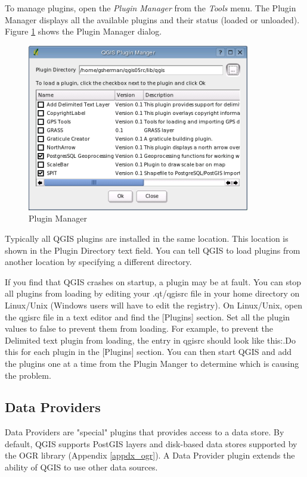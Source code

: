 \documentclass[10pt,english]{article}
\newcommand\qgistip[1]{\raggedright\small{#1}}
\begin{document}
\begin{onehalfspace}
To manage plugins, open the \textsl{Plugin Manager} from the \textsl{Tools} menu. The Plugin Manager displays all the available plugins and their status (loaded or unloaded). Figure \ref{fig:pluginmanager} shows the Plugin Manager dialog.

\begin{figure}[h]
   \begin{center}
   \caption{Plugin Manager}\label{fig:pluginmanager}\smallskip
   \includegraphics{qgis_user_guide_images/pluginmanager_80pct}
\end{center}  
\end{figure}
Typically all QGIS plugins are installed in the same location. This location is shown in the Plugin Directory text field. You can tell QGIS to load plugins from another location by specifying a different directory.
\begin{Tip}\caption{\textsc{Crashing Plugins}}
\qgistip{If you find that QGIS crashes on startup, a plugin may be at fault. You can stop all plugins from loading by editing your .qt/qgisrc file in your home directory on Linux/Unix (Windows users will have to edit the registry). On Linux/Unix, open the qgisrc file in a text editor and find the [Plugins] section. Set all the plugin values to false to prevent them from loading. For example, to prevent the Delimited text plugin from loading, the entry in qgisrc should look like this:\ttfamily{
 Add Delimited Text Layer=false}.\normalfont  Do this for each plugin in the [Plugins] section. You can then start QGIS and add the plugins one at a time from the Plugin Manger to determine which is causing the problem.

}
\end{Tip} 

\subsection{Data Providers}
Data Providers are "special" plugins that provides access to a data store. By default, QGIS supports PostGIS layers and disk-based data stores supported by the OGR library (Appendix \ref{appdx_ogr}). A Data Provider plugin extends the ability of QGIS to use other data sources.\\


\end{onehalfspace}
\end{document}
